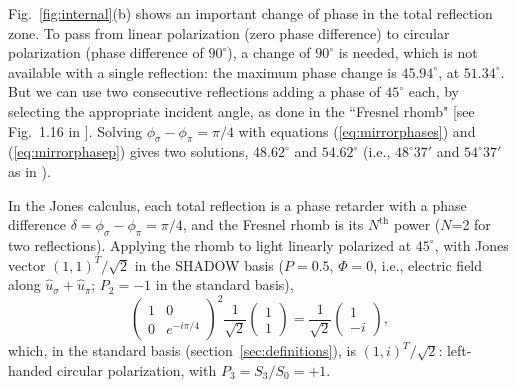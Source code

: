 \documentclass{iucr}
\begin{document}
Fig.~\ref{fig:internal}(b) shows an important change of phase in the total reflection zone. To pass from linear polarization (zero phase difference) to circular polarization (phase difference of $90^\circ$), a change of $90^\circ$ is needed, which is not available with a single reflection: the maximum phase change is $45.94^\circ$, at $51.34^\circ$.
But we can use two consecutive reflections adding a phase of $45^\circ$ each, by selecting the appropriate incident angle, as done in the ``Fresnel rhomb" [see Fig.~1.16 in \cite{born_wolf}]. Solving $\phi_\sigma-\phi_\pi=\pi/4$ with equations (\ref{eq:mirrorphases}) and (\ref{eq:mirrorphasep}) gives two solutions, $48.62^\circ$ and $54.62^\circ$ (i.e., $48^\circ37'$ and $54^\circ37'$ as in \cite{born_wolf}).

In the Jones calculus, each total reflection is a phase retarder with a phase difference $\delta=\phi_\sigma-\phi_\pi=\pi/4$, and the Fresnel rhomb is its $N^\text{th}$ power ($N$=2 for two reflections). Applying the rhomb to light linearly polarized at $45^\circ$, with Jones vector $(1,1)^T/\sqrt{2}$ in the SHADOW basis ($P=0.5$, $\Phi=0$, i.e., electric field along $\hat{u}_\sigma+\hat{u}_\pi$; $P_2=-1$ in the standard basis),
\begin{equation}\label{eq:Jrhomb}
\begin{pmatrix}
1  &
0 \\
0&
e^{-i\pi/4}
\end{pmatrix}^2
\frac{1}{\sqrt{2}}\begin{pmatrix}
1  \\
1
\end{pmatrix} = \frac{1}{\sqrt{2}}\begin{pmatrix}
1  \\
-i
\end{pmatrix},
\end{equation}
which, in the standard basis (section~\ref{sec:definitions}), is $(1,i)^T/\sqrt{2}$: left-handed circular polarization, with $P_3=S_3/S_0=+1$.
\end{document}
